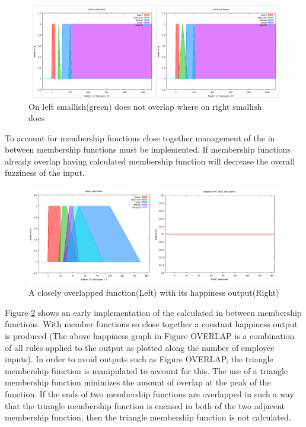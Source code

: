\documentclass[12pt,fleqn,reqno,letterpaper]{article}
\begin{document}
\begin{figure}[H]
  \centering
  \includegraphics[scale=0.5,natwidth=1360,natheight=504]{fig/crossover.png}
  \caption{On left smallish(green) does not overlap where on right smallish does}
  \label{fig:CROSSOVER}
\end{figure}

To account for membership functions close together management of the in between membership functions must be implemented.  If membership functions already overlap having calculated membership function will decrease the overall fuzziness of the input.

\begin{figure}[H]
  \centering
  \includegraphics[scale=0.5,natwidth=1297,natheight=501]{fig/overlap.png}
  \caption{A closely overlapped function(Left) with its happiness output(Right)}
  \label{fig:OVERLAP}
\end{figure}

Figure \ref{fig:OVERLAP} shows an early implementation of the calculated in between membership functions.  With member functions so close together a constant happiness output is produced (The above happiness graph in Figure OVERLAP is a combination of all rules applied to the output as plotted along the number of employee inputs).  In order to avoid outputs such as Figure OVERLAP, the triangle membership function is manipulated to account for this.  The use of a triangle membership function minimizes the amount of overlap at the peak of the function.  If the ends of two membership functions are overlapped in such a way that the triangle membership function is encased in both of the two adjacent membership function, then the triangle membership function is not calculated.
\end{document}
